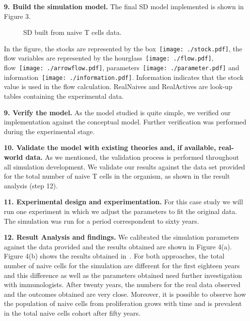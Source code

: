 \documentclass{llncs}
\begin{document}
{\bf 9. Build the simulation model.} The final SD model implemented is shown in Figure 3.

  \begin{figure*}[!htpb]
    \vspace{-20pt}
    \centering
    \vspace{-10pt}
    \caption{SD built from naive T cells data.}
    \vspace{-20pt}
    \label{fig:SDNaiveFromScratch}
  \end{figure*}

In the figure, the stocks are represented by the box~\texttt{[image: ./stock.pdf]}, the flow variables are represented by the hourglass~\texttt{[image: ./flow.pdf]}, flow~\texttt{[image: ./arrowflow.pdf]},  parameters~\texttt{[image: ./parameter.pdf]} and information~\texttt{[image: ./information.pdf]}. Information indicates that the stock value is used in the flow calculation. RealNaives and RealActives are look-up tables containing the experimental data.

{\bf 9. Verify the model.} As the model studied is quite simple, we verified our implementation against the conceptual model. Further verification was performed during the experimental stage.

{\bf 10. Validate the model with existing theories and, if available, real-world data.} As we mentioned, the validation process is performed throughout all simulation development. We validate our results against the data set provided for the total number of naive T cells in the organism, as shown in the result analysis (step 12). 

{\bf 11. Experimental design and experimentation.} For this case study we will run one experiment in which we adjust the parameters to fit the original data. The simulation was run for a period correspondent to sixty years.

{\bf 12. Result Analysis and findings.} We calibrated the simulation parameters against the data provided and the results obtained are shown in Figure 4(a). Figure 4(b) shows the results obtained in~\cite{Murray:2003}. For both approaches, the total number of naive cells for the simulation are different for the first eighteen years and this difference as well as the parameters obtained need further investigation with immunologists. After twenty years, the numbers for the real data observed and the outcomes obtained are very close. Moreover, it is possible to observe how the population of naive cells from proliferation grows with time and is prevalent in the total naive cells cohort after fifty years.
\end{document}
